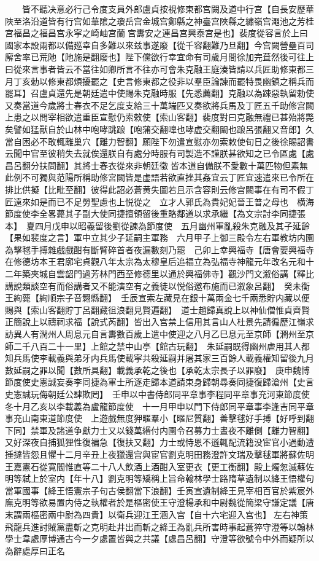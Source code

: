 　　皆不聽决意必行己令度支員外郎盧貞按視修東都宫闕及道中行宫【自長安歷華陜至洛沿道皆有行宫如華隂之瓊岳宫金城宫鄭縣之神臺宫陜縣之繡嶺宫澠池之芳桂宫福昌之福昌宫永寜之崎岫宫蘭宫夀安之連昌宫興泰宫是也】裴度從容言於上曰國家本設兩都以備廵幸自多難以來兹事遂廢【從千容翻難乃旦翻】今宫闕營壘百司廨舍率已荒阤【阤施是翻廢也】陛下儻欲行幸宜命有司歲月間徐加完葺然後可往上曰從來言事者皆云不當往如卿所言不往亦可會朱克融王庭湊皆請以兵匠助修東都三月丁亥勅以修東都煩擾罷之【史言修東都之役非以羣臣論諫而罷特畏幽鎮之稱兵而罷耳】召盧貞還先是朝廷遣中使賜朱克融時服【先悉薦翻】克融以為踈惡執留勅使又奏當道今歲將士春衣不足乞度支給三十萬端匹又奏欲將兵馬及丁匠五千助修宫闕上患之以問宰相欲遣重臣宣慰仍索敕使【索山客翻】裴度對曰克融無禮已甚殆將斃矣譬如猛獸自於山林中咆哮跳踉【咆蒲交翻嘷也哮虚交翻闞也踉呂張翻又音郎】久當自困必不敢輒離巢穴【離力智翻】願陛下勿遣宣慰亦勿索敕使旬日之後徐賜詔書云聞中官至彼稍失去就俟還朕自有處分時服有司製造不謹朕甚欲知之已令區處【處昌呂翻分扶問翻】其將士春衣從來非朝廷徵皆本道自備朕不愛數十萬匹物但素無此例不可獨與范陽所稱助修宮闕皆是虚語若欲直挫其姦宜云丁匠宜速遣來已令所在排比供擬【比毗至翻】彼得此詔必蒼黄失圖若且示含容則云修宫闕事在有司不假丁匠遠來如是而已不足勞聖慮也上悦從之　立才人郭氏為貴妃妃晉王普之母也　横海節度使李全畧薨其子副大使同捷擅領留後重賂鄰道以求承繼【為文宗討李同捷張本】　夏四月戊申以昭義留後劉從諫為節度使　五月幽州軍亂殺朱克融及其子延齡【果如裴度之言】軍中立其少子延嗣主軍務　六月甲子上御三殿令左右軍教坊内園為擊毬手搏雜戲戲酣有斷臂碎首者夜漏數刻乃罷　己卯上幸興福寺【唐會要興福寺在修德坊本王君廓宅貞觀八年太宗為太穆皇后追福立為弘福寺神龍元年改名元和十二年築夾城自雲韶門過芳林門西至修德里以通於興福佛寺】觀沙門文溆俗講【釋比講說類談空有而俗講者又不能演空有之義徒以悦俗邀布施而已溆象呂翻】　癸未衡王絢薨【絢順宗子音翾縣翻】　壬辰宣索左藏見在銀十萬兩金七千兩悉貯内藏以便賜與【索山客翻貯丁呂翻藏徂浪翻見賢遍翻】　道士趙歸真說上以神仙僧惟貞齊賢正簡說上以禱祠求福【說式芮翻】皆出入宫禁上信用其言山人杜景先請徧歷江嶺求訪異人有潤州人周息元自言夀數百歲上遣中使迎之八月乙巳息元至京師【潤州至京師二千八百二十一里】上館之禁中山亭【館古玩翻】　朱延嗣既得幽州虐用其人都知兵馬使李載義與弟牙内兵馬使載寜共殺延嗣并屠其家三百餘人載義權知留後九月數延嗣之罪以聞【數所具翻】載義承乾之後也【承乾太宗長子以罪廢】　庚申魏博節度使史憲誠妄奏李同捷為軍士所逐走歸本道請束身歸朝尋奏同捷復歸滄州【史言史憲誠玩侮朝廷公肆欺罔】　壬申以中書侍郎同平章事李程同平章事充河東節度使　冬十月乙亥以李載義為盧龍節度使　十一月甲申以門下侍郎同平章事李逢吉同平章事充山南東道節度使　上遊戲無度狎暱羣小【暱尼質翻】善擊毬好手搏【好呼到翻下同】禁軍及諸道争獻力士又以錢萬緡付内園令召募力士晝夜不離側【離力智翻】又好深夜自捕狐狸性復褊急【復扶又翻】力士或恃恩不遜輒配流籍没宦官小過動遭捶撻皆怨且懼十二月辛丑上夜獵還宫與宦官劉克明田務澄許文瑞及擊毬軍將蘇佐明王嘉憲石從寛閻惟直等二十八人飲酒上酒酣入室更衣【更工衡翻】殿上燭怱滅蘇佐明等弑上於室内【年十八】劉克明等矯稱上旨命翰林學士路隋草遺制以絳王悟權句當軍國事【絳王悟憲宗子句古侯翻當下浪翻】壬寅宣遺制絳王見宰相百官於紫宸外廡克明等欲易置内侍之執權者於是樞密使王守澄楊承和中尉魏從簡梁守謙定議【唐末謂兩樞密兩中尉為四貴】以衛兵迎江王涵入宫【自十六宅迎入宫也】左右神策飛龍兵進討賊黨盡斬之克明赴井出而斬之絳王為亂兵所害時事起蒼猝守澄等以翰林學士韋處厚博通古今一夕處置皆與之共議【處昌呂翻】守澄等欲號令中外而疑所以為辭處厚曰正名